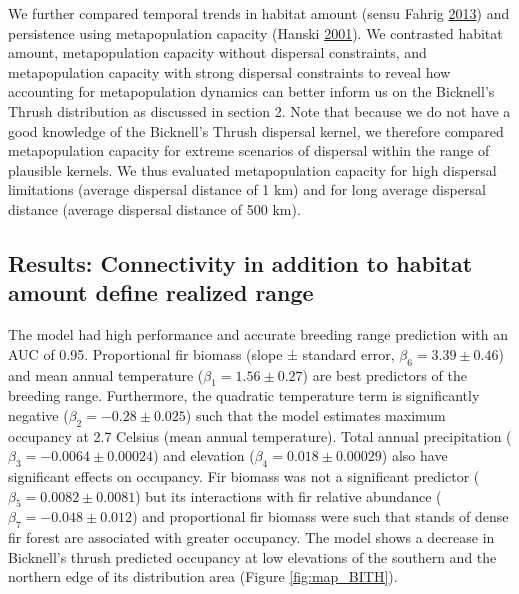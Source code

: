 \documentclass[12pt]{article}
\begin{document}
We further compared temporal trends in habitat amount (sensu Fahrig
\protect\hyperlink{ref-fahrig_rethinking_2013}{2013}) and persistence
using metapopulation capacity (Hanski
\protect\hyperlink{ref-hanski_spatially_2001}{2001}). We contrasted
habitat amount, metapopulation capacity without dispersal constraints,
and metapopulation capacity with strong dispersal constraints to reveal
how accounting for metapopulation dynamics can better inform us on the
Bicknell's Thrush distribution as discussed in section 2. Note that
because we do not have a good knowledge of the Bicknell's Thrush
dispersal kernel, we therefore compared metapopulation capacity for
extreme scenarios of dispersal within the range of plausible kernels. We
thus evaluated metapopulation capacity for high dispersal limitations
(average dispersal distance of 1 km) and for long average dispersal
distance (average dispersal distance of 500 km).

\hypertarget{results-connectivity-in-addition-to-habitat-amount-define-realized-range}{%
\subsection{Results: Connectivity in addition to habitat amount define
realized
range}\label{results-connectivity-in-addition-to-habitat-amount-define-realized-range}}

The model had high performance and accurate breeding range prediction
with an AUC of 0.95. Proportional fir biomass (slope ± standard error,
\(\beta_6 = 3.39 \pm 0.46\)) and mean annual temperature
(\(\beta_1 = 1.56 \pm 0.27\)) are best predictors of the breeding range.
Furthermore, the quadratic temperature term is significantly negative
(\(\beta_2 = -0.28 \pm 0.025\)) such that the model estimates maximum
occupancy at 2.7 Celsius (mean annual temperature). Total annual
precipitation (\(\beta_3 = -0.0064 \pm 0.00024\)) and elevation
(\(\beta_4 = 0.018 \pm 0.00029\)) also have significant effects on
occupancy. Fir biomass was not a significant predictor
(\(\beta_5 = 0.0082 \pm 0.0081\)) but its interactions with fir relative
abundance (\(\beta_7 = -0.048 \pm 0.012\)) and proportional fir biomass
were such that stands of dense fir forest are associated with greater
occupancy. The model shows a decrease in Bicknell's thrush predicted
occupancy at low elevations of the southern and the northern edge of its
distribution area (Figure \ref{fig:map_BITH}).
\end{document}
